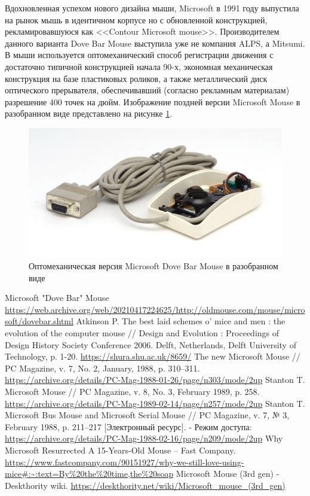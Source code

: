 \documentclass[11pt, a4paper]{article}
\begin{document}
Вдохновленная успехом нового дизайна мыши, Microsoft в 1991 году выпустила на рынок мышь в идентичном корпусе но с обновленной конструкцией, рекламировавшуюся как <<Contour Microsoft mouse>>. Производителем данного варианта Dove Bar Mouse выступила уже не компания ALPS, а Mitsumi. В мыши используется оптомеханический способ регистрации движения с достаточно типичной конструкцией начала 90-х, экономная механическая конструкция на базе пластиковых роликов, а также металлический диск оптического прерывателя, обеспечивавший (согласно рекламным материалам) разрешение 400 точек на дюйм. Изображение поздней версии Microsoft Mouse в разобранном виде представлено на рисунке \ref{fig:MicrosoftDoveBarInside2}.

\begin{figure}[h]
    \centering
    \includegraphics[scale=0.5]{1987_microsoft_dove_bar_mouse/inside2_60.jpg}
    \caption{Оптомеханическая версия Microsoft Dove Bar Mouse в разобранном виде}
    \label{fig:MicrosoftDoveBarInside2}
\end{figure}



\begin{thebibliography}{9}
 Microsoft "Dove Bar" Mouse \url{https://web.archive.org/web/20210417224625/http://oldmouse.com/mouse/microsoft/dovebar.shtml}
 Atkinson P. The best laid schemes o’ mice and men : the evolution of the computer mouse // Design and Evolution : Proceedings of Design History Society Conference 2006. Delft, Netherlands, Delft University of Technology, p. 1-20. \url{https://shura.shu.ac.uk/8659/}
 The new Microsoft Mouse // PC Magazine, v. 7, No. 2, January, 1988, p. 310--311. \url{https://archive.org/details/PC-Mag-1988-01-26/page/n303/mode/2up}
 Stanton T. Microsoft Mouse // PC Magazine, v. 8, No. 3, February 1989, p. 258. \url{https://archive.org/details/PC-Mag-1989-02-14/page/n257/mode/2up}
 Stanton T. Microsoft Bus Mouse and Microsoft Serial Mouse // PC Magazine, v. 7, № 3, February 1988, p. 211--217 [Электронный ресурс]. - Режим доступа: \url{https://archive.org/details/PC-Mag-1988-02-16/page/n209/mode/2up}
 Why Microsoft Resurrected A 15-Years-Old Mouse -- Fast Company. \url{https://www.fastcompany.com/90151927/why-we-still-love-using-mice#:~:text=By%20the%20time,the%20soap}
 Microsoft Mouse (3rd gen) - Deskthority wiki. \url{https://deskthority.net/wiki/Microsoft_mouse_(3rd_gen)}
\end{thebibliography}
\end{document}
